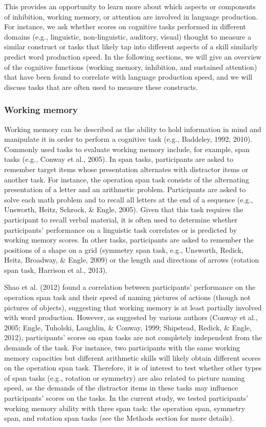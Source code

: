 \documentclass[
  man,floatsintext]{apa6}
\begin{document}
This provides an opportunity to learn more about which aspects or components of inhibition, working memory, or attention are involved in language production. For instance, we ask whether scores on cognitive tasks performed in different domains (e.g., linguistic, non-linguistic, auditory, visual) thought to measure a similar construct or tasks that likely tap into different aspects of a skill similarly predict word production speed. In the following sections, we will give an overview of the cognitive functions (working memory, inhibition, and sustained attention) that have been found to correlate with language production speed, and we will discuss tasks that are often used to measure these constructs.

\hypertarget{working-memory}{%
\subsubsection{Working memory}\label{working-memory}}

Working memory can be described as the ability to hold information in mind and manipulate it in order to perform a cognitive task (e.g., Baddeley, 1992, 2010). Commonly used tasks to evaluate working memory include, for example, span tasks (e.g., Conway et al., 2005). In span tasks, participants are asked to remember target items whose presentation alternates with distractor items or another task. For instance, the operation span task consists of the alternating presentation of a letter and an arithmetic problem. Participants are asked to solve each math problem and to recall all letters at the end of a sequence (e.g., Unsworth, Heitz, Schrock, \& Engle, 2005). Given that this task requires the participant to recall verbal material, it is often used to determine whether participants' performance on a linguistic task correlates or is predicted by working memory scores. In other tasks, participants are asked to remember the positions of a shape on a grid (symmetry span task, e.g., Unsworth, Redick, Heitz, Broadway, \& Engle, 2009) or the length and directions of arrows (rotation span task, Harrison et al., 2013).

Shao et al. (2012) found a correlation between participants' performance on the operation span task and their speed of naming pictures of actions (though not pictures of objects), suggesting that working memory is at least partially involved with word production. However, as suggested by various authors (Conway et al., 2005; Engle, Tuholski, Laughlin, \& Conway, 1999; Shipstead, Redick, \& Engle, 2012), participants' scores on span tasks are not completely independent from the demands of the task. For instance, two participants with the same working memory capacities but different arithmetic skills will likely obtain different scores on the operation span task. Therefore, it is of interest to test whether other types of span tasks (e.g., rotation or symmetry) are also related to picture naming speed, as the demands of the distractor items in these tasks may influence participants' scores on the tasks. In the current study, we tested participants' working memory ability with three span task: the operation span, symmetry span, and rotation span tasks (see the Methods section for more details).
\end{document}
